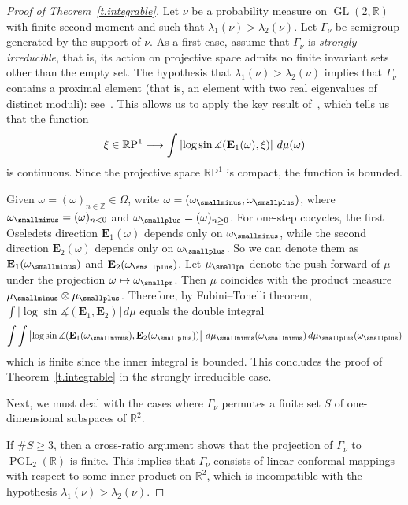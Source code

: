 \documentclass[AHL,Unicode,longabstracts,published]{cedram}
\DeclareMathOperator{\PGL}{PGL}
\newcommand{\Z}{\mathbb{Z}}
\newcommand{\R}{\mathbb{R}}
\newcommand{\E}{\mathbf{E}}
\newcommand{\rmP}{\mathrm{P}}
\DeclareMathOperator{\GL}{GL}
\renewcommand{\angle}{\measuredangle}
\let\oldmapsto\mapsto
\renewcommand*{\mapsto}{\mathchoice{\longmapsto}{\oldmapsto}{\oldmapsto}{\oldmapsto}}
\DeclareMathOperator{\GL}{GL}
\newcommand{\R}{\mathbb{R}}
\begin{document}
\begin{proof}[Proof of Theorem~\ref{t.integrable}]
Let $\nu$ be a probability measure on $\GL(2,\R)$ with finite second moment and such that $\lambda_1(\nu) > \lambda_2(\nu)$. Let $\Gamma_\nu$ be semigroup generated by the support of $\nu$. As a first case, assume that $\Gamma_\nu$ is \emph{strongly irreducible}, that is, its action on projective space admits no finite invariant sets other than the empty set. The hypothesis that $\lambda_1(\nu) > \lambda_2(\nu)$ implies that $\Gamma_\nu$ contains a proximal element (that is, an element with two real eigenvalues of distinct moduli): see~\cite[Lemma~4.1]{BQbook}. This allows us to apply the key result of~\cite[Proposition~4.5]{benoist-quint}, which tells us that the function
\begin{equation}
\xi \in \R \rmP^1 \mapsto \int \left| \log \sin \angle (\E_1(\omega), \xi) \right| \, d\mu(\omega)
\end{equation}
is continuous. Since the projective space $\R \rmP^1$ is compact, the function is bounded.

Given $\omega = (\omega)_{n \in \Z} \in \Omega$, write $\omega = (\omega_{\smallminus},\omega_{\smallplus})$, where $\omega_{\smallminus} = (\omega)_{n<0}$ and $\omega_{\smallplus} = (\omega)_{n \ge 0}$. For one-step cocycles, the first Oseledets direction $\E_1(\omega)$ depends only on $\omega_{\smallminus}$, while the second direction $\E_2(\omega)$ depends only on $\omega_{\smallplus}$. So we can denote them as $\E_1(\omega_{\smallminus})$ and $\E_2(\omega_{\smallplus})$. Let $\mu_{\smallpm}$ denote the push-forward of $\mu$ under the projection $\omega \mapsto \omega_{\smallpm}$. Then $\mu$ coincides with the product measure $\mu_\smallminus \otimes \mu_\smallplus$. Therefore, by Fubini--Tonelli theorem, $\int \left| \log \sin \angle (\E_1, \E_2) \right| \, d\mu$ equals the double integral
\begin{equation}
\int \int \left| \log \sin \angle (\E_1(\omega_{\smallminus}), \E_2(\omega_{\smallplus})) \right| \, d\mu_{\smallminus}(\omega_{\smallminus}) \, d\mu_{\smallplus}(\omega_{\smallplus})
\end{equation}
which is finite since the inner integral is bounded. This concludes the proof of Theorem~\ref{t.integrable} in the strongly irreducible case.

Next, we must deal with the cases where $\Gamma_\nu$ permutes a finite set $S$ of one-dimensional subspaces of $\R^2$.

If $\# S \ge 3$, then a cross-ratio argument shows that the projection of $\Gamma_\nu$ to $\PGL_2(\R)$ is finite. This implies that $\Gamma_\nu$ consists of linear conformal mappings with respect to some inner product on $\R^2$, which is incompatible with the hypothesis $\lambda_1(\nu) > \lambda_2(\nu)$.


\end{proof}
\end{document}
